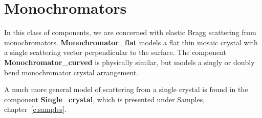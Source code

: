 
\chapter{Monochromators}

In this class of components, we are concerned with elastic Bragg
scattering from monochromators. {\bf Monochromator\_flat} 
models a flat thin mosaic crystal with a single scattering vector
perpendicular to the surface.  
The component {\bf Monochromator\_curved} is physically similar, 
but models a singly or doubly bend monochromator crystal arrangement.

A much more general model of scattering from a single crystal is 
found in the component {\bf Single\_crystal},
which is presented under Samples, chapter~\ref{c:samples}.


\newpage


